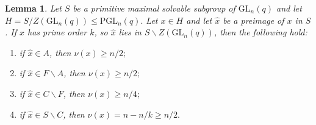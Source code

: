\documentclass[a4paper,reqno,11pt]{amsart}
\newtheorem{Lem}[Th]{Lemma}
\theoremstyle{definition}
\theoremstyle{remark}
\numberwithin{equation}{section}
\newcommand{\GL}{{\mathrm{GL}}}
\newcommand{\PGL}{{\mathrm{PGL}}}
\begin{document}
\begin{Lem}\label{6}
 Let $S$  be a primitive maximal  solvable subgroup of $\GL_n(q)$ and let $H=S/Z(\GL_n(q)) \le \PGL_n(q).$ Let $x \in H$ and let $\hat{x}$ be a preimage of $x$ in $S$. If $x$ has prime order $k$, so  $\hat{x}$ lies in $S \backslash Z(\GL_n(q))$, then %
the following hold:
\begin{enumerate}[font=\normalfont]
\item if $\hat{x} \in A$, then $\nu(x) \ge n/2; $ \label{6it1}
\item if $\hat{x}  \in F \backslash A$, then $\nu(x) \ge n/2; $ \label{6it2}
\item if $\hat{x}  \in C \backslash F$, then $\nu(x) \ge n/4; $ \label{6it3}
\item if $\hat{x}  \in S \backslash C$, then $\nu(x)=n-n/k \ge n/2. $ \label{6it4}
\end{enumerate}
\end{Lem}
\end{document}
